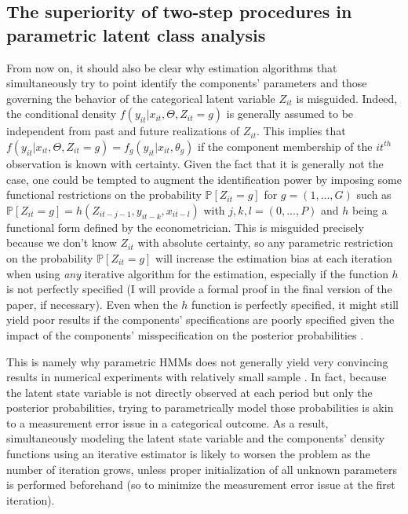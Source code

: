 \documentclass[11pt,letter]{article}
\begin{document}
\subsection{The superiority of two-step procedures in parametric latent class analysis}
From now on, it should also be clear why estimation algorithms that simultaneously try to point identify the components' parameters and those governing the behavior of the categorical latent variable $Z_{it}$ is misguided. Indeed, the conditional density $f(y_{it}|x_{it},\Theta, Z_{it}=g)$ is generally assumed to be independent from past and future realizations of $Z_{it}$. This implies that $f(y_{it}|x_{it},\Theta, Z_{it}=g) = f_g(y_{it}|x_{it},\theta_g)$ if the component membership of the $it^{th}$ observation is known with certainty. Given the fact that it is generally not the case, one could be tempted to augment the identification power by imposing some functional restrictions on the probability $\mathbb{P}[Z_{it}=g]$ for $g = (1,...,G)$ such as $\mathbb{P}[Z_{it}=g] = h(Z_{it-j-1}, y_{it-k}, x_{it-l})$ with $j,k,l = (0,...,P)$ and $h$ being a functional form defined by the econometrician. This is misguided precisely because we don't know $Z_{it}$ with absolute certainty, so any parametric restriction on the probability $\mathbb{P}[Z_{it}=g]$ will increase the estimation bias at each iteration when using \textit{any} iterative algorithm for the estimation, especially if the function $h$ is not perfectly specified (I will provide a formal proof in the final version of the paper, if necessary). Even when the $h$ function is perfectly specified, it might still yield poor results if the components' specifications are poorly specified given the impact of the components' misspecification on the posterior probabilities \citep{gassiat_inference_2016}.
\par
This is namely why parametric HMMs does not generally yield very convincing results in numerical experiments with relatively small sample  \citep{luo_bayesian_2021}. In fact, because the latent state variable is not directly observed at each period but only the posterior probabilities, trying to parametrically model those probabilities is akin to a measurement error issue in a categorical outcome. As a result, simultaneously modeling the latent state variable and the components' density functions using an iterative estimator is likely to worsen the problem as the number of iteration grows, unless proper initialization of all unknown parameters is performed beforehand (so to minimize the measurement error issue at the first iteration).
\end{document}
